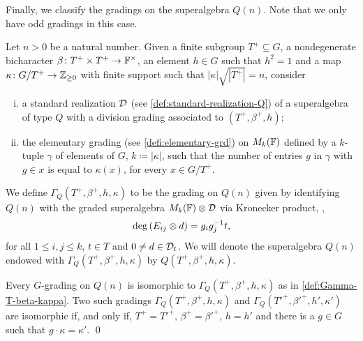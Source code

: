 
Finally, we classify the gradings on the superalgebra $Q(n)$. 
Note that we only have odd gradings in this case. 


\begin{defi}\label{def:Gamma-T-beta-kappa-Q}
    Let $n > 0$ be a natural number. 
    Given a finite subgroup $T^+ \subseteq G$, a nondegenerate bicharacter $\beta\colon T^+ \times T^+ \to \mathbb{F}^\times$, an element $h\in G$ such that $h^2 = 1$ and a map $\kappa\colon G/T^+ \to \mathbb{Z}_{\geq 0}$ with finite support such that $|\kappa| \sqrt{|T^+|} = n$, consider 
    \begin{enumerate}[(i)]
        \item a standard realization $\mathcal{D}$ (see \cref{def:standard-realization-Q}) of a superalgebra of type $Q$ with a division grading associated to $(T^+, \beta^+, h)$;
        \item the elementary grading (see \cref{defi:elementary-grd}) on $M_{k}(\mathbb{F})$ defined by a $k$-tuple $\gamma$ 
        of elements of $G$, $k \coloneqq |\kappa|$, such that the number of entries $g$ in $\gamma$ with $g\in x$ is equal to $\kappa (x)$, for every $x\in G/T^+$.  
    \end{enumerate}
    We define $\Gamma_Q (T^+, \beta^+, h, \kappa)$ to be the grading on $Q(n)$ given by identifying $Q(n)$ with the graded superalgebra $M_k(\mathbb{F}) \otimes \mathcal{D}$ via Kronecker product, \ie,
    \[
        \deg \left( E_{ij} \otimes d \right) = g_ig_j^{-1} t,
    \] 
    for all $1\leq i, j \leq k$, $t\in T$ and $0 \neq d \in \mathcal{D}_t$. 
    We will denote the superalgebra $Q(n)$ endowed with $\Gamma_Q (T^+, \beta^+, h, \kappa)$ by $Q (T^+, \beta^+, h, \kappa)$. 
\end{defi}

\begin{cor}\label{cor:iso-Q}
    Every $G$-grading on $Q(n)$ is isomorphic to $\Gamma_Q (T^+, \beta^+, h, \kappa)$ as in \cref{def:Gamma-T-beta-kappa}. 
    Two such gradings $\Gamma_Q (T^+, \beta^+, h, \kappa)$ and $\Gamma_Q (T'^+, \beta'^+, h', \kappa')$ are isomorphic if, and only if, $T^+ = T'^+$, $\beta^+ = \beta'^+$, $h = h'$ and there is a $g\in G$ such that $g\cdot \kappa = \kappa'$. \qed
\end{cor}